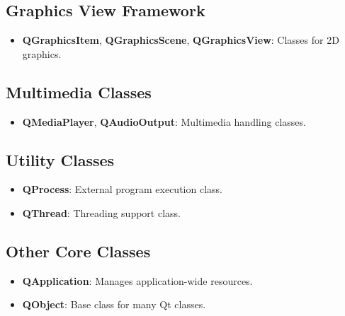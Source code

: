 \documentclass{report}
\begin{document}
    \bigbreak \noindent
    \subsection{Graphics View Framework}
    \begin{itemize}
        \item \textbf{QGraphicsItem}, \textbf{QGraphicsScene}, \textbf{QGraphicsView}: Classes for 2D graphics.
    \end{itemize}

    \bigbreak \noindent 
    \subsection{Multimedia Classes}
    \begin{itemize}
        \item \textbf{QMediaPlayer}, \textbf{QAudioOutput}: Multimedia handling classes.
    \end{itemize}

    \bigbreak \noindent 
    \subsection{Utility Classes}
    \begin{itemize}
        \item \textbf{QProcess}: External program execution class.
        \item \textbf{QThread}: Threading support class.
    \end{itemize}

    \bigbreak \noindent 
    \subsection{Other Core Classes}
    \begin{itemize}
        \item \textbf{QApplication}: Manages application-wide resources.
        \item \textbf{QObject}: Base class for many Qt classes.
    \end{itemize}
\end{document}
